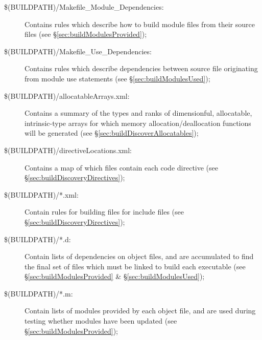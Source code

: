 \begin{description}
\item[{\normalfont \ttfamily \$(BUILDPATH)/Makefile\_Module\_Dependencies}:] Contains rules which describe how to build module files from their source files (see \S\ref{sec:buildModulesProvided});

\item[{\normalfont \ttfamily \$(BUILDPATH)/Makefile\_Use\_Dependencies}:] Contains rules which describe dependencies between source file originating from module {\normalfont \ttfamily use} statements (see \S\ref{sec:buildModulesUsed});

\item[{\normalfont \ttfamily \$(BUILDPATH)/allocatableArrays.xml}:] Contains a summary of the types and ranks of dimensionful, allocatable, intrinsic-type arrays for which memory allocation/deallocation functions will be generated (see \S\ref{sec:buildDiscoverAllocatables});

\item[{\normalfont \ttfamily \$(BUILDPATH)/directiveLocations.xml}:] Contains a map of which files contain each code directive (see \S\ref{sec:buildDiscoveryDirectives});

\item[{\normalfont \ttfamily \$(BUILDPATH)/*.xml}:] Contain rules for building files for {\normalfont \ttfamily include} files (see \S\ref{sec:buildDiscoveryDirectives});

\item[{\normalfont \ttfamily \$(BUILDPATH)/*.d}:] Contain lists of dependencies on object files, and are accumulated to find the final set of files which must be linked to build each executable (see \S\ref{sec:buildModulesProvided} \& \S\ref{sec:buildModulesUsed});

\item[{\normalfont \ttfamily \$(BUILDPATH)/*.m}:] Contain lists of modules provided by each object file, and are used during testing whether modules have been updated (see \S\ref{sec:buildModulesProvided});


\end{description}
